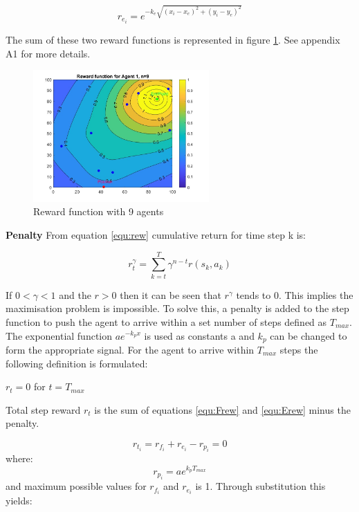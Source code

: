 \begin{equation}
    r_{e_i} = e^{-k_e\sqrt{({x}_i - {x}_e )^2 + ({y}_i - {y}_e)^2}}
    \label{equ:Erew}
\end{equation}

\noindent
The sum of these two reward functions is represented in figure \ref{fig:RewardFunc}. See appendix A1 for more details.

\begin{figure}[h]
  \begin{center}
    \includegraphics[width=0.60\textwidth]{figures/Reward.jpg}
    \end{center}
    \caption{Reward function with 9 agents}
    \label{fig:RewardFunc}
\end{figure}
\clearpage
\noindent
\textbf{Penalty}\newline
From equation \ref{equ:rew} cumulative return for time step k is:

\[r_t^\gamma = \sum_{k =  t}^T\gamma^{n-t}r(s_k,a_k)\]

If $0 < \gamma < 1$ and the $r > 0$ then it can be seen that $r^\gamma$ tends to 0. This implies the maximisation problem is impossible. To solve this, a penalty is added to the step function to push the agent to arrive within a set number of steps defined as $T_{max}$.  The exponential function $ae^{-k_{p}x}$ is used as constants a and $k_p$ can be changed to form the appropriate signal. For the agent to arrive within $T_{max}$ steps the following definition is formulated:
\begin{center}
    \(r_t = 0\) for \(t = T_{max}\)
\end{center}

Total step reward $r_t$ is the sum of equations \ref{equ:Frew} and \ref{equ:Erew} minus the penalty.

\[r_{t_i} = r_{f_i} + r_{e_i} - r_{p_i} = 0\]
where:
\[r_{p_i} = ae^{k_{p}T_{max}}\]
and maximum possible values for $r_{f_i}$ and $r_{e_i}$ is 1. Through substitution this yields:

